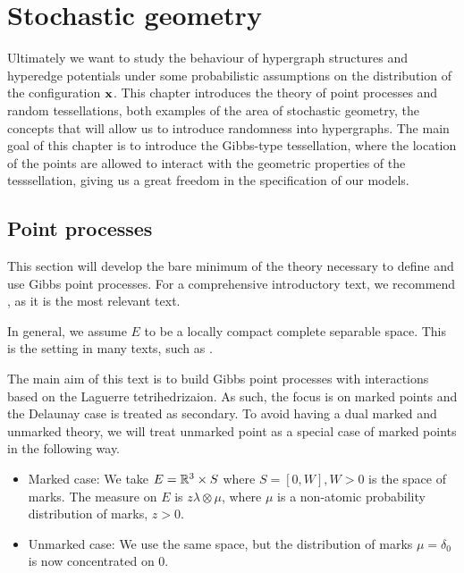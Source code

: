 \chapter{Stochastic geometry}\label{ch:2}
Ultimately we want to study the behaviour of hypergraph structures and hyperedge potentials under some probabilistic assumptions on the distribution of the configuration ${\mathbf{x}}$. This chapter introduces the theory of point processes and random tessellations, both examples of the area of stochastic geometry, the concepts that will allow us to introduce randomness into hypergraphs. The main goal of this chapter is to introduce the Gibbs-type tessellation, where the location of the points are allowed to interact with the geometric properties of the tesssellation, giving us a great freedom in the specification of our models.

\section{Point processes}
This section will develop the bare minimum of the theory necessary to define and use Gibbs point processes. For a comprehensive introductory text, we recommend \cite{MollerWaagepetersen2003}, as it is the most relevant text. 


In general, we assume $E$ to be a locally compact complete separable space. This is the setting in many texts, such as \cite{SchneiderWeil2008}.

The main aim of this text is to build Gibbs point processes with interactions based on the Laguerre tetrihedrizaion. As such, the focus is on marked points and the Delaunay case is treated as secondary. To avoid having a dual marked and unmarked theory, we will treat unmarked point as a special case of marked points in the following way. 

\begin{itemize}
	\item Marked case: We take $E={\mathbb R^3}\times S$ where $S=[0,W],W>0$ is the space of marks. The measure on $E$ is $z\lambda \otimes \mu$, where $\mu$ is a non-atomic probability distribution of marks, $z>0$. 
	\item Unmarked case: We use the same space, but the distribution of marks $\mu=\delta_0$ is now concentrated on $0$.
\end{itemize}



